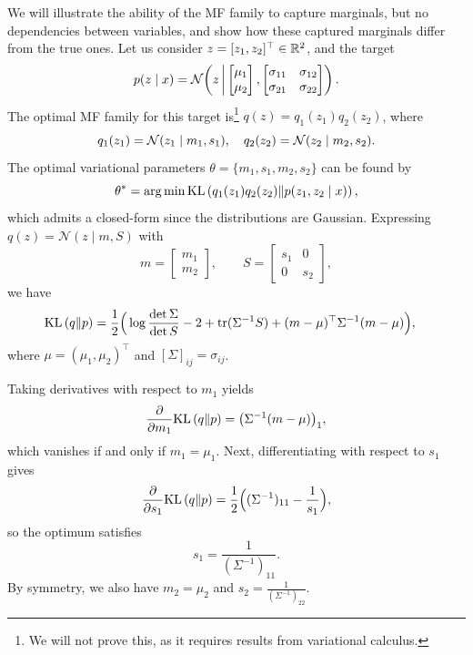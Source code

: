 \begin{example}
    We will illustrate the ability of the MF family to capture marginals, but no dependencies between variables, and show how these captured marginals differ from the true ones. Let us consider $z = [z_1,z_2]^\top\in{\mathbb R}^2$, and the target 
    \[
    p(z \mid x)
    =
    {\mathcal N}\!\left(
    z \,\middle|\,
    \begin{bmatrix}
    \mu_1 \\
    \mu_2
    \end{bmatrix},
    \begin{bmatrix}
    \sigma_{11} & \sigma_{12} \\
    \sigma_{21} & \sigma_{22}
    \end{bmatrix}
    \right).
    \]
    The optimal MF family for this target is\footnote{We will not prove this, as it requires results from variational calculus.}  $q(z) = q_1(z_1)q_2(z_2)$, where  
    \[
    q_1(z_1) = {\mathcal N}(z_1 \mid m_1, s_1), \quad  q_2(z_2) = {\mathcal N}(z_2 \mid m_2, s_2). 
    \]
    The  optimal variational parameters $\theta = \{m_1,s_1,m_2,s_2\}$ can be found by
    \[
    \theta^* = \operatorname*{arg\,min} \text{KL}\left(q_1(z_1)q_2(z_2)\middle\|p(z_1,z_2 \mid x)\right),
    \]
    which admits a closed-form since the distributions are Gaussian. Expressing  \(q(z)=\mathcal N(z\mid m, S)\) with
    \[
    m =
    \begin{bmatrix}
    m_1\\
    m_2
    \end{bmatrix},
    \qquad
    S =
    \begin{bmatrix}
    s_1 & 0\\
    0 & s_2
    \end{bmatrix},
    \]
    we have
    \begin{align*}
    \text{KL}\left(q\middle\|p\right)
    &=
    \frac12\Big(
    \log\frac{\det\Sigma}{\det S}
    -2
    +\operatorname{tr}(\Sigma^{-1}S)
    +(m-\mu)^\top\Sigma^{-1}(m-\mu)
    \Big),
    \end{align*}
    where \(\mu=(\mu_1,\mu_2)^\top\) and \([\Sigma]_{ij}=\sigma_{ij}\).

    Taking derivatives with respect to \(m_1\) yields
    \[
    \frac{\partial}{\partial m_1}\text{KL}\left(q\middle\|p\right)
    =
    \big(\Sigma^{-1}(m-\mu)\big)_1,
    \]
    which vanishes if and only if \(m_1=\mu_1\). Next, differentiating with respect to \(s_1\) gives
    \[
    \frac{\partial}{\partial s_1}\text{KL}\left(q\middle\|p\right)
    =
    \frac12\Big(
    (\Sigma^{-1})_{11}
    -
    \frac{1}{s_1}
    \Big),
    \]
    so the optimum satisfies
    \[
    s_1 = \frac{1}{(\Sigma^{-1})_{11}}.
    \]
     By symmetry, we also have $m_2=\mu_2$ and $s_2 = \frac{1}{(\Sigma^{-1})_{22}}$.


\end{example}
